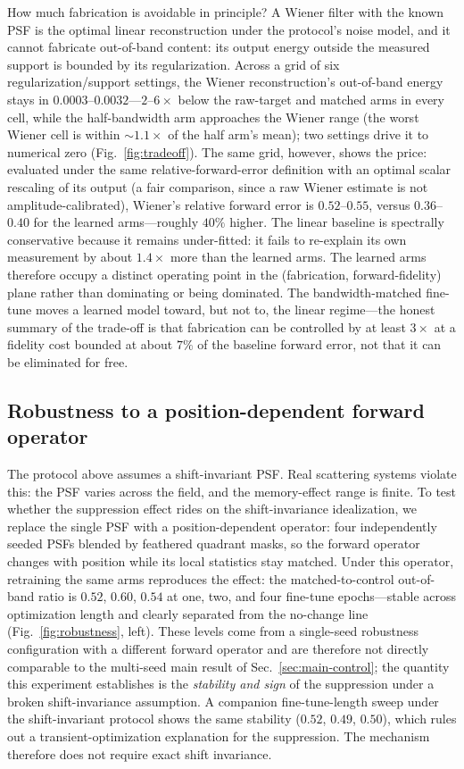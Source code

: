 How much fabrication is avoidable in principle? A Wiener filter with the known PSF is the optimal linear reconstruction under the protocol's noise model, and it cannot fabricate out-of-band content: its output energy outside the measured support is bounded by its regularization. Across a grid of six regularization/support settings, the Wiener reconstruction's out-of-band energy stays in $0.0003$--$0.0032$---$2$--$6\times$ below the raw-target and matched arms in every cell, while the half-bandwidth arm approaches the Wiener range (the worst Wiener cell is within ${\sim}1.1\times$ of the half arm's mean); two settings drive it to numerical zero (Fig.~\ref{fig:tradeoff}). The same grid, however, shows the price: evaluated under the same relative-forward-error definition with an optimal scalar rescaling of its output (a fair comparison, since a raw Wiener estimate is not amplitude-calibrated), Wiener's relative forward error is $0.52$--$0.55$, versus $0.36$--$0.40$ for the learned arms---roughly $40\%$ higher. The linear baseline is spectrally conservative because it remains under-fitted: it fails to re-explain its own measurement by about $1.4\times$ more than the learned arms. The learned arms therefore occupy a distinct operating point in the (fabrication, forward-fidelity) plane rather than dominating or being dominated. The bandwidth-matched fine-tune moves a learned model toward, but not to, the linear regime---the honest summary of the trade-off is that fabrication can be controlled by at least $3\times$ at a fidelity cost bounded at about $7\%$ of the baseline forward error, not that it can be eliminated for free.

\subsection{Robustness to a position-dependent forward operator}
\label{sec:svpsf}

The protocol above assumes a shift-invariant PSF. Real scattering systems violate this: the PSF varies across the field, and the memory-effect range is finite. To test whether the suppression effect rides on the shift-invariance idealization, we replace the single PSF with a position-dependent operator: four independently seeded PSFs blended by feathered quadrant masks, so the forward operator changes with position while its local statistics stay matched. Under this operator, retraining the same arms reproduces the effect: the matched-to-control out-of-band ratio is $0.52$, $0.60$, $0.54$ at one, two, and four fine-tune epochs---stable across optimization length and clearly separated from the no-change line (Fig.~\ref{fig:robustness}, left). These levels come from a single-seed robustness configuration with a different forward operator and are therefore not directly comparable to the multi-seed main result of Sec.~\ref{sec:main-control}; the quantity this experiment establishes is the \emph{stability and sign} of the suppression under a broken shift-invariance assumption. A companion fine-tune-length sweep under the shift-invariant protocol shows the same stability ($0.52$, $0.49$, $0.50$), which rules out a transient-optimization explanation for the suppression. The mechanism therefore does not require exact shift invariance.

